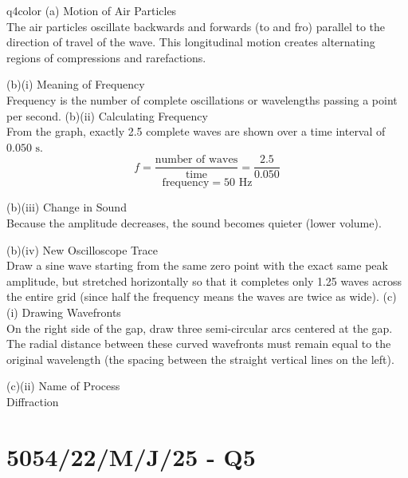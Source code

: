 \documentclass[11pt,a4paper]{article}
\newcommand{\qsection}[1]{\needspace{10\baselineskip}\section*{#1}}
\begin{document}
\begin{ansbox}{q4color}
(a) Motion of Air Particles\\[4pt]
The air particles oscillate backwards and forwards (to and fro) parallel to the direction of travel of the wave. This longitudinal motion creates alternating regions of compressions and rarefactions.

\vspace{4pt}
(b)(i) Meaning of Frequency\\[4pt]
Frequency is the number of complete oscillations or wavelengths passing a point per second.
\clearpage
\vspace{4pt}
(b)(ii) Calculating Frequency\\[4pt]
From the graph, exactly 2.5 complete waves are shown over a time interval of $0.050 \text{ s}$.
\[ f = \frac{\text{number of waves}}{\text{time}} = \frac{2.5}{0.050} \]
\[ \text{frequency} = \boxed{50 \text{ Hz}} \]

\vspace{4pt}
(b)(iii) Change in Sound\\[4pt]
Because the amplitude decreases, the sound becomes quieter (lower volume).

\vspace{4pt}
(b)(iv) New Oscilloscope Trace\\[4pt]
Draw a sine wave starting from the same zero point with the exact same peak amplitude, but stretched horizontally so that it completes only 1.25 waves across the entire grid (since half the frequency means the waves are twice as wide).
\clearpage
\vspace{4pt}
(c)(i) Drawing Wavefronts\\[4pt]
On the right side of the gap, draw three semi-circular arcs centered at the gap. The radial distance between these curved wavefronts must remain equal to the original wavelength (the spacing between the straight vertical lines on the left).

\vspace{4pt}
(c)(ii) Name of Process\\[4pt]
Diffraction
\end{ansbox}

\qsection{5054/22/M/J/25 - Q5}\label{p2_mj25:q5}
\end{document}
